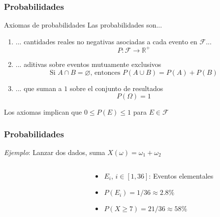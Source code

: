 \documentclass[xcolor=dvipsnames,10pt]{beamer}
\begin{document}
\begin{frame}
  \frametitle{Probabilidades}
  \begin{definicion*}{Axiomas de probabilidades}{}
    Las probabilidades son...
    \begin{enumerate}
    \item ... cantidades reales no negativas asociadas a cada evento en $\mathcal{F}$...
      \begin{equation*}
        P \colon \mathcal{F} \to \mathbb{R}^+
      \end{equation*}
    \item ... aditivas sobre eventos mutuamente exclusivos
      \begin{equation*}
        \text{Si } A \cap B = \varnothing \text{, entonces } P(A \cup B) = P(A) + P(B)
      \end{equation*}
    \item ... que suman a $1$ sobre el conjunto de resultados
      \begin{equation*}
        P(\Omega) = 1
      \end{equation*}
    \end{enumerate}
  \end{definicion*}
  \pause
  Los axiomas implican que $0 \leq P(E) \leq 1$ para $E \in \mathcal{F}$
\end{frame}
%
\begin{frame}
  \frametitle{Probabilidades}
  \emph{Ejemplo}: Lanzar dos dados, suma $X(\omega) = \omega_1 + \omega_2$
  \begin{columns}
    \begin{column}{0.48\textwidth}
      \begin{figure}
        \centering%
        \def\szx{0.75cm}%
        \def\szy{0.75cm}
      \end{figure}
    \end{column}
    \begin{column}{0.48\textwidth}
      \begin{itemize}
      \item $E_i$, $i \in [1, 36]$: Eventos elementales
      \item $P(E_i) = 1 / 36 \approx 2.8\%$
        \item $P(X \geq 7) = 21 / 36 \approx 58\%$
      \end{itemize}
    \end{column}
  \end{columns}
\end{frame}
\end{document}
